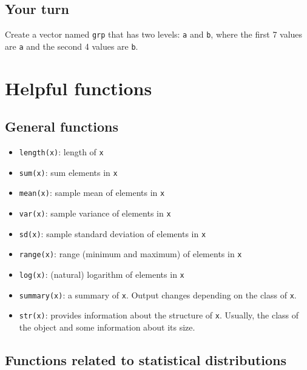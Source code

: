 \documentclass[
]{article}
\providecommand{\tightlist}{%
  \setlength{\itemsep}{0pt}\setlength{\parskip}{0pt}}
\begin{document}
\hypertarget{your-turn-8}{%
\subsection{Your turn}\label{your-turn-8}}

Create a vector named \texttt{grp} that has two levels: \texttt{a} and
\texttt{b}, where the first 7 values are \texttt{a} and the second 4
values are \texttt{b}.

\hypertarget{helpful-functions}{%
\section{Helpful functions}\label{helpful-functions}}

\hypertarget{general-functions}{%
\subsection{General functions}\label{general-functions}}

\begin{itemize}
\tightlist
\item
  \texttt{length(x)}: length of \texttt{x}
\item
  \texttt{sum(x)}: sum elements in \texttt{x}
\item
  \texttt{mean(x)}: sample mean of elements in \texttt{x}
\item
  \texttt{var(x)}: sample variance of elements in \texttt{x}
\item
  \texttt{sd(x)}: sample standard deviation of elements in \texttt{x}
\item
  \texttt{range(x)}: range (minimum and maximum) of elements in
  \texttt{x}
\item
  \texttt{log(x)}: (natural) logarithm of elements in \texttt{x}
\item
  \texttt{summary(x)}: a summary of \texttt{x}. Output changes depending
  on the class of \texttt{x}.
\item
  \texttt{str(x)}: provides information about the structure of
  \texttt{x}. Usually, the class of the object and some information
  about its size.
\end{itemize}

\hypertarget{functions-related-to-statistical-distributions}{%
\subsection{Functions related to statistical
distributions}\label{functions-related-to-statistical-distributions}}
\end{document}
